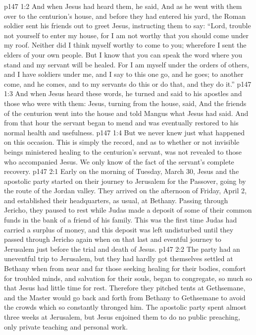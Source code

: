 \vs p147 1:2 And when Jesus had heard them, he said,  And as he went with them over to the centurion’s house, and before they had entered his yard, the Roman soldier sent his friends out to greet Jesus, instructing them to say: “Lord, trouble not yourself to enter my house, for I am not worthy that you should come under my roof. Neither did I think myself worthy to come to you; wherefore I sent the elders of your own people. But I know that you can speak the word where you stand and my servant will be healed. For I am myself under the orders of others, and I have soldiers under me, and I say to this one go, and he goes; to another come, and he comes, and to my servants do this or do that, and they do it.”
\vs p147 1:3 And when Jesus heard these words, he turned and said to his apostles and those who were with them:  Jesus, turning from the house, said,  And the friends of the centurion went into the house and told Mangus what Jesus had said. And from that hour the servant began to mend and was eventually restored to his normal health and usefulness.
\vs p147 1:4 But we never knew just what happened on this occasion. This is simply the record, and as to whether or not invisible beings ministered healing to the centurion’s servant, was not revealed to those who accompanied Jesus. We only know of the fact of the servant’s complete recovery.
\vs p147 2:1 Early on the morning of Tuesday, March 30, Jesus and the apostolic party started on their journey to Jerusalem for the Passover, going by the route of the Jordan valley. They arrived on the afternoon of Friday, April 2, and established their headquarters, as usual, at Bethany. Passing through Jericho, they paused to rest while Judas made a deposit of some of their common funds in the bank of a friend of his family. This was the first time Judas had carried a surplus of money, and this deposit was left undisturbed until they passed through Jericho again when on that last and eventful journey to Jerusalem just before the trial and death of Jesus.
\vs p147 2:2 The party had an uneventful trip to Jerusalem, but they had hardly got themselves settled at Bethany when from near and far those seeking healing for their bodies, comfort for troubled minds, and salvation for their souls, began to congregate, so much so that Jesus had little time for rest. Therefore they pitched tents at Gethsemane, and the Master would go back and forth from Bethany to Gethsemane to avoid the crowds which so constantly thronged him. The apostolic party spent almost three weeks at Jerusalem, but Jesus enjoined them to do no public preaching, only private teaching and personal work.
